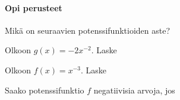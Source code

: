 \begin{tehtavasivu}

\paragraph*{Opi perusteet}

\begin{tehtava}
Mikä on seuraavien potenssifunktioiden aste?
\begin{alakohdat}
\end{alakohdat}
\begin{vastaus}
\begin{alakohdat}
\end{alakohdat}
\end{vastaus}
\end{tehtava}

\begin{tehtava}
Olkoon $g(x)=-2x^{-2}$. Laske
\begin{alakohdat}
\end{alakohdat}
\begin{vastaus}
\begin{alakohdat}
\end{alakohdat}
\end{vastaus}
\end{tehtava}

\begin{tehtava}
Olkoon $f(x)=x^{-3}$. Laske
\begin{alakohdat}
\end{alakohdat}
\begin{vastaus}
\begin{alakohdat}
\end{alakohdat}
\end{vastaus}
\end{tehtava}

\begin{tehtava}
Saako potenssifunktio $f$ negatiivisia arvoja, jos
\begin{alakohdat}
\end{alakohdat}
\begin{vastaus}
\begin{alakohdat}
\end{alakohdat}
\end{vastaus}
\end{tehtava}


\end{tehtavasivu}
